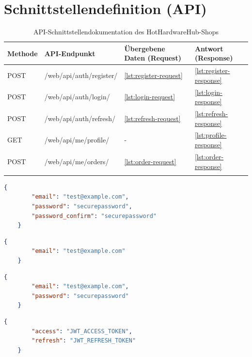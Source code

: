 \documentclass[%
	ngerman,
	12pt,
	a4paper,
	oneside,
	parskip=full
]{scrbook}
\begin{document}
\chapter{Schnittstellendefinition (API)}

\begin{longtable}{|l|l|l|l|}
	\hline
	\textbf{Methode} & \textbf{API-Endpunkt} & \textbf{Übergebene Daten (Request)} & \textbf{Antwort (Response)} \\
	\hline
	POST & /web/api/auth/register/ & \ref{lst:register-request} & \ref{lst:register-response} \\
	\hline
	POST & /web/api/auth/login/ & \ref{lst:login-request} & \ref{lst:login-response} \\
	\hline
	POST & /web/api/auth/refresh/ & \ref{lst:refresh-request} & \ref{lst:refresh-response} \\
	\hline
	GET & /web/api/me/profile/ & - & \ref{lst:profile-response} \\
	\hline
	POST & /web/api/me/orders/ & \ref{lst:order-request} & \ref{lst:order-response} \\
	\hline
	\caption{API-Schnittstellendokumentation des HotHardwareHub-Shops}
	\label{tab:api_docs}
\end{longtable}

\begin{lstlisting}[language=json, caption={Request für Registrierung}, label=lst:register-request]
	{
		"email": "test@example.com",
		"password": "securepassword",
		"password_confirm": "securepassword"
	}
\end{lstlisting}

\begin{lstlisting}[language=json, caption={Response für Registrierung}, label=lst:register-response]
	{
		"email": "test@example.com"
	}
\end{lstlisting}

\begin{lstlisting}[language=json, caption={Request für Login}, label=lst:login-request]
	{
		"email": "test@example.com",
		"password": "securepassword"
	}
\end{lstlisting}

\begin{lstlisting}[language=json, caption={Response für Login}, label=lst:login-response]
	{
		"access": "JWT_ACCESS_TOKEN",
		"refresh": "JWT_REFRESH_TOKEN"
	}
\end{lstlisting}
\end{document}
